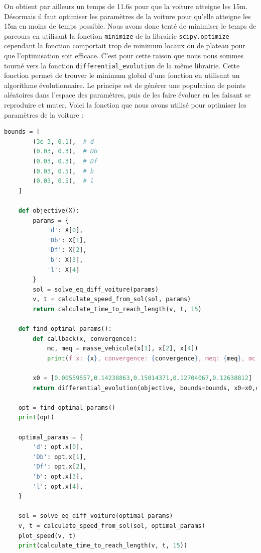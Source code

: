 \documentclass{report}
\begin{document}
On obtient par ailleurs un temps de 11.6s pour que la voiture atteigne les 15m. Désormais il faut optimiser les paramètres de la voiture pour qu'elle atteigne les 15m en moins de temps possible. Nous avons donc tenté de minimiser le temps de parcours en utilisant la fonction \texttt{minimize} de la librairie \texttt{scipy.optimize} cependant la fonction comportait trop de minimum locaux ou de plateau pour que l'optimisation soit efficace. C'est pour cette raison que nous nous sommes tourné vers la fonction \texttt{differential\_evolution} de la même librairie. Cette fonction permet de trouver le minimum global d'une fonction en utilisant un algorithme évolutionnaire. Le principe est de générer une population de points aléatoires dans l'espace des paramètres, puis de les faire évoluer en les faisant se reproduire et muter. Voici la fonction que nous avons utilisé pour optimiser les paramètres de la voiture : \\
\begin{lstlisting}[language=Python]
    bounds = [
        (3e-3, 0.1),  # d
        (0.03, 0.3),  # Db
        (0.03, 0.3),  # Df
        (0.03, 0.5),  # b
        (0.03, 0.5),  # l
    ]
    
    def objective(X):
        params = {
            'd': X[0],
            'Db': X[1],
            'Df': X[2],
            'b': X[3],
            'l': X[4]
        }
        sol = solve_eq_diff_voiture(params)
        v, t = calculate_speed_from_sol(sol, params)
        return calculate_time_to_reach_length(v, t, 15)
    
    def find_optimal_params():
        def callback(x, convergence):
            mc, meq = masse_vehicule(x[1], x[2], x[4])
            print(f'x: {x}, convergence: {convergence}, meq: {meq}, mc: {mc}')
    
        x0 = [0.00559557,0.14238863,0.15014371,0.12704067,0.12638812]
        return differential_evolution(objective, bounds=bounds, x0=x0,callback=callback, disp=True, workers=-1, updating='deferred',maxiter=100)
    
    opt = find_optimal_params()
    print(opt)
    
    optimal_params = {
        'd': opt.x[0],
        'Db': opt.x[1],
        'Df': opt.x[2],
        'b': opt.x[3],
        'l': opt.x[4],
    }
    
    sol = solve_eq_diff_voiture(optimal_params)
    v, t = calculate_speed_from_sol(sol, optimal_params)
    plot_speed(v, t)
    print(calculate_time_to_reach_length(v, t, 15))
\end{lstlisting}
\end{document}
